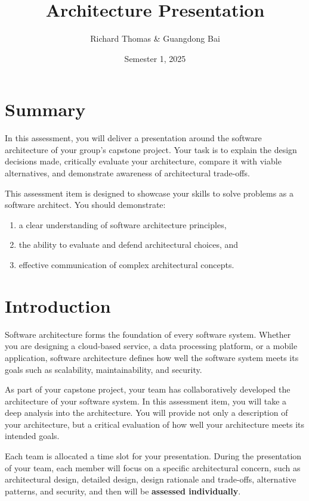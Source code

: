 \documentclass{csse4400}
\title{Architecture Presentation}
\author{Richard Thomas \& Guangdong Bai}
\date{Semester 1, 2025}
\begin{document}

\maketitle

\section*{Summary}

In this assessment, you will deliver a presentation around the software architecture of your group's capstone project.
Your task is to explain the design decisions made, critically evaluate your architecture, compare it with viable alternatives, and demonstrate awareness of architectural trade-offs.

This assessment item is designed to showcase your skills to solve problems as a software architect. You should demonstrate:
\begin{enumerate}
    \item a clear understanding of software architecture principles,
    \item the ability to evaluate and defend architectural choices, and
    \item effective communication of complex architectural concepts.
\end{enumerate}


\section{Introduction}

Software architecture forms the foundation of every software system. Whether you are designing a cloud-based service, a data processing platform, or a mobile application, software architecture defines how well the software system meets its goals such as scalability, maintainability, and security.

As part of your capstone project, your team has collaboratively developed the architecture of your software system.
In this assessment item, you will take a deep analysis into the architecture.
You will provide not only a description of your architecture, but a critical evaluation of how well your architecture meets its intended goals.

Each team is allocated a time slot for your presentation.
During the presentation of your team, each member will focus on a specific architectural concern, such as architectural design, detailed design, design rationale and trade-offs, alternative patterns, and security, and then will be \textbf{assessed individually}.
\end{document}
